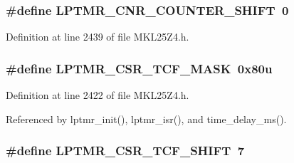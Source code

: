 \subsubsection[{\texorpdfstring{L\+P\+T\+M\+R\+\_\+\+C\+N\+R\+\_\+\+C\+O\+U\+N\+T\+E\+R\+\_\+\+S\+H\+I\+FT}{LPTMR_CNR_COUNTER_SHIFT}}]{\setlength{\rightskip}{0pt plus 5cm}\#define L\+P\+T\+M\+R\+\_\+\+C\+N\+R\+\_\+\+C\+O\+U\+N\+T\+E\+R\+\_\+\+S\+H\+I\+FT~0}\hypertarget{group___l_p_t_m_r___register___masks_ga3769a974a3d95250e32bb154fa134c3f}{}\label{group___l_p_t_m_r___register___masks_ga3769a974a3d95250e32bb154fa134c3f}


Definition at line 2439 of file M\+K\+L25\+Z4.\+h.

\subsubsection[{\texorpdfstring{L\+P\+T\+M\+R\+\_\+\+C\+S\+R\+\_\+\+T\+C\+F\+\_\+\+M\+A\+SK}{LPTMR_CSR_TCF_MASK}}]{\setlength{\rightskip}{0pt plus 5cm}\#define L\+P\+T\+M\+R\+\_\+\+C\+S\+R\+\_\+\+T\+C\+F\+\_\+\+M\+A\+SK~0x80u}\hypertarget{group___l_p_t_m_r___register___masks_ga13b5dd6085ca2a8cf0f06550b7557b6b}{}\label{group___l_p_t_m_r___register___masks_ga13b5dd6085ca2a8cf0f06550b7557b6b}


Definition at line 2422 of file M\+K\+L25\+Z4.\+h.



Referenced by lptmr\+\_\+init(), lptmr\+\_\+isr(), and time\+\_\+delay\+\_\+ms().

\subsubsection[{\texorpdfstring{L\+P\+T\+M\+R\+\_\+\+C\+S\+R\+\_\+\+T\+C\+F\+\_\+\+S\+H\+I\+FT}{LPTMR_CSR_TCF_SHIFT}}]{\setlength{\rightskip}{0pt plus 5cm}\#define L\+P\+T\+M\+R\+\_\+\+C\+S\+R\+\_\+\+T\+C\+F\+\_\+\+S\+H\+I\+FT~7}\hypertarget{group___l_p_t_m_r___register___masks_ga0ffa48fac670327deffc2e17ef1dea68}{}\label{group___l_p_t_m_r___register___masks_ga0ffa48fac670327deffc2e17ef1dea68}


